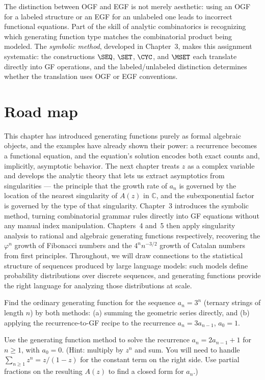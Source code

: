 The distinction between OGF and EGF is not merely aesthetic: using an OGF for a labeled structure or an EGF for an unlabeled one leads to incorrect functional equations. Part of the skill of analytic combinatorics is recognizing which generating function type matches the combinatorial product being modeled. The \emph{symbolic method}, developed in Chapter~3, makes this assignment systematic: the constructions $\SEQ$, $\SET$, $\CYC$, and $\MSET$ each translate directly into GF operations, and the labeled/unlabeled distinction determines whether the translation uses OGF or EGF conventions.

\section*{Road map}

This chapter has introduced generating functions purely as formal algebraic objects, and the examples have already shown their power: a recurrence becomes a functional equation, and the equation's solution encodes both exact counts and, implicitly, asymptotic behavior. The next chapter treats $z$ as a complex variable and develops the analytic theory that lets us extract asymptotics from singularities --- the principle that the growth rate of $a_n$ is governed by the location of the nearest singularity of $A(z)$ in $\mathbb{C}$, and the subexponential factor is governed by the type of that singularity. Chapter~3 introduces the symbolic method, turning combinatorial grammar rules directly into GF equations without any manual index manipulation. Chapters~4 and~5 then apply singularity analysis to rational and algebraic generating functions respectively, recovering the $\varphi^n$ growth of Fibonacci numbers and the $4^n n^{-3/2}$ growth of Catalan numbers from first principles. Throughout, we will draw connections to the statistical structure of sequences produced by large language models: such models define probability distributions over discrete sequences, and generating functions provide the right language for analyzing those distributions at scale.

\begin{exercise}
Find the ordinary generating function for the sequence $a_n = 3^n$ (ternary strings of length $n$) by both methods: (a) summing the geometric series directly, and (b) applying the recurrence-to-GF recipe to the recurrence $a_n = 3a_{n-1}$, $a_0 = 1$.
\end{exercise}

\begin{exercise}
Use the generating function method to solve the recurrence $a_n = 2a_{n-1} + 1$ for $n \ge 1$, with $a_0 = 0$. (Hint: multiply by $z^n$ and sum. You will need to handle $\sum_{n \ge 1} z^n = z/(1-z)$ for the constant term on the right side. Use partial fractions on the resulting $A(z)$ to find a closed form for $a_n$.)
\end{exercise}

